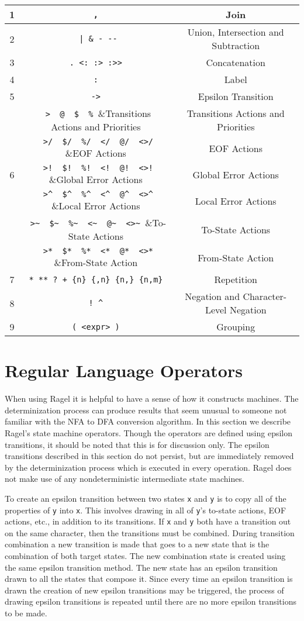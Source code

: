 \documentclass[letterpaper,11pt,oneside]{book}
\newcommand{\verbspace}{\vspace{10pt}}
\begin{document}
\verbspace
\begin{tabular}{|c|c|c|}
\hline
1&\verb| , |&Join\\
\hline
2&\verb/ | & - --/&Union, Intersection and Subtraction\\
\hline
3&\verb| . <: :> :>> |&Concatenation\\
\hline
4&\verb| : |&Label\\
\hline
5&\verb| -> |&Epsilon Transition\\
\hline
&\verb| >  @  $  % |&Transitions Actions and Priorities\\
\cline{2-3}
&\verb| >/  $/  %/  </  @/  <>/ |&EOF Actions\\
\cline{2-3}
6&\verb| >!  $!  %!  <!  @!  <>! |&Global Error Actions\\
\cline{2-3}
&\verb| >^  $^  %^  <^  @^  <>^ |&Local Error Actions\\
\cline{2-3}
&\verb| >~  $~  %~  <~  @~  <>~ |&To-State Actions\\
\cline{2-3}
&\verb| >*  $*  %*  <*  @*  <>* |&From-State Action\\
\hline
7&\verb| * ** ? + {n} {,n} {n,} {n,m} |&Repetition\\
\hline
8&\verb| ! ^ |&Negation and Character-Level Negation\\
\hline
9&\verb| ( <expr> ) |&Grouping\\
\hline
\end{tabular}

\section{Regular Language Operators}
\label{machconst}

When using Ragel it is helpful to have a sense of how it constructs machines.
The determinization process can produce results that seem unusual to someone
not familiar with the NFA to DFA conversion algorithm. In this section we
describe Ragel's state machine operators. Though the operators are defined
using epsilon transitions, it should be noted that this is for discussion only.
The epsilon transitions described in this section do not persist, but are
immediately removed by the determinization process which is executed in every
operation. Ragel does not make use of any nondeterministic intermediate state
machines. 

To create an epsilon transition between two states \verb|x| and \verb|y| is to
copy all of the properties of \verb|y| into \verb|x|. This involves drawing in
all of \verb|y|'s to-state actions, EOF actions, etc., in addition to its
transitions. If \verb|x| and \verb|y| both have a transition out on the same
character, then the transitions must be combined.  During transition
combination a new transition is made that goes to a new state that is the
combination of both target states. The new combination state is created using
the same epsilon transition method.  The new state has an epsilon transition
drawn to all the states that compose it. Since every time an epsilon transition
is drawn the creation of new epsilon transitions may be triggered, the process
of drawing epsilon transitions is repeated until there are no more epsilon
transitions to be made.
\end{document}
